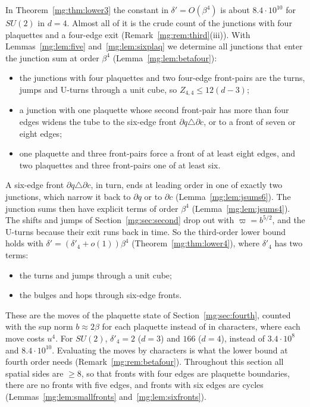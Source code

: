 \documentclass[11pt,a4paper]{article}
\theoremstyle{definition}
\theoremstyle{remark}
\begin{document}
In Theorem~\ref{mg:thm:lower3} the constant in $\delta'=O(\beta^4)$ is about $8.4\cdot10^{10}$ for $SU(2)$ in $d=4$. Almost all of it is the crude count of the
junctions with four plaquettes and a four-edge exit (Remark~\ref{mg:rem:third}(iii)). With Lemmas~\ref{mg:lem:five} and~\ref{mg:lem:sixplaq} we determine all
junctions that enter the junction sum at order $\beta^4$ (Lemma~\ref{mg:lem:betafour}):
\begin{itemize}
\item the junctions with four plaquettes and two four-edge front-pairs are the turns, jumps and U-turns through a unit cube, so $Z_{4,4}\le12(d-3)$;
\item a junction with one plaquette whose second front-pair has more than four edges widens the tube to the six-edge front $\partial q\triangle\partial c$, or to a
front of seven or eight edges;
\item one plaquette and three front-pairs force a front of at least eight edges, and two plaquettes and three front-pairs one of at least six.
\end{itemize}
A six-edge front $\partial q\triangle\partial c$, in turn, ends at leading order in one of exactly two junctions, which narrow it back to $\partial q$ or to $\partial c$
(Lemma~\ref{mg:lem:jsums6}). The junction sums then have explicit terms of order $\beta^4$ (Lemma~\ref{mg:lem:jsums4}). The shifts and jumps of
Section~\ref{mg:sec:second} drop out with $\varpi=b^{5/2}$, and the U-turns because their exit runs back in time. So the third-order lower bound holds with
$\delta'=(\delta'_4+o(1))\beta^4$ (Theorem~\ref{mg:thm:lower4}), where $\delta'_4$ has two terms:
\begin{itemize}
\item the turns and jumps through a unit cube;
\item the bulges and hops through six-edge fronts.
\end{itemize}
These are the moves of the plaquette state of Section~\ref{mg:sec:fourth}, counted with the sup norm $b\approx2\beta$ for each plaquette instead of in characters,
where each move costs $u^4$. For $SU(2)$,
$\delta'_4=2$ ($d=3$) and $166$ ($d=4$), instead of $3.4\cdot10^8$ and $8.4\cdot10^{10}$. Evaluating the moves by characters is what the lower bound at fourth order
needs (Remark~\ref{mg:rem:betafour}). Throughout this section all spatial sides are $\ge8$, so that fronts with
four edges are plaquette boundaries, there are no fronts with five edges, and fronts with six edges are cycles (Lemmas~\ref{mg:lem:smallfronts}
and~\ref{mg:lem:sixfronts}).
\end{document}

